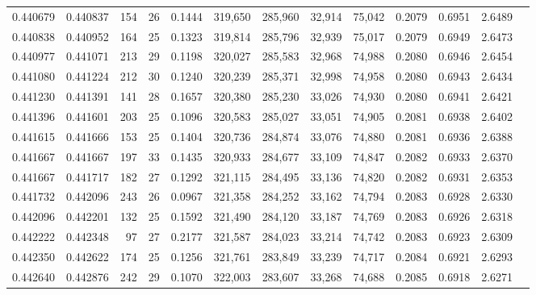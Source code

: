 \begin{tabular}{rrrrrrrrrrrrr}
0.440679 & 0.440837 &    154 &    26 &                                     0.1444 & 319,650 & 285,960 &  32,914 &  75,042 & 0.2079 & 0.6951 & 2.6489 \\
0.440838 & 0.440952 &    164 &    25 &                                     0.1323 & 319,814 & 285,796 &  32,939 &  75,017 & 0.2079 & 0.6949 & 2.6473 \\
0.440977 & 0.441071 &    213 &    29 &                                     0.1198 & 320,027 & 285,583 &  32,968 &  74,988 & 0.2080 & 0.6946 & 2.6454 \\
0.441080 & 0.441224 &    212 &    30 &                                     0.1240 & 320,239 & 285,371 &  32,998 &  74,958 & 0.2080 & 0.6943 & 2.6434 \\
0.441230 & 0.441391 &    141 &    28 &                                     0.1657 & 320,380 & 285,230 &  33,026 &  74,930 & 0.2080 & 0.6941 & 2.6421 \\
0.441396 & 0.441601 &    203 &    25 &                                     0.1096 & 320,583 & 285,027 &  33,051 &  74,905 & 0.2081 & 0.6938 & 2.6402 \\
0.441615 & 0.441666 &    153 &    25 &                                     0.1404 & 320,736 & 284,874 &  33,076 &  74,880 & 0.2081 & 0.6936 & 2.6388 \\
0.441667 & 0.441667 &    197 &    33 &                                     0.1435 & 320,933 & 284,677 &  33,109 &  74,847 & 0.2082 & 0.6933 & 2.6370 \\
0.441667 & 0.441717 &    182 &    27 &                                     0.1292 & 321,115 & 284,495 &  33,136 &  74,820 & 0.2082 & 0.6931 & 2.6353 \\
0.441732 & 0.442096 &    243 &    26 &                                     0.0967 & 321,358 & 284,252 &  33,162 &  74,794 & 0.2083 & 0.6928 & 2.6330 \\
0.442096 & 0.442201 &    132 &    25 &                                     0.1592 & 321,490 & 284,120 &  33,187 &  74,769 & 0.2083 & 0.6926 & 2.6318 \\
0.442222 & 0.442348 &     97 &    27 &                                     0.2177 & 321,587 & 284,023 &  33,214 &  74,742 & 0.2083 & 0.6923 & 2.6309 \\
0.442350 & 0.442622 &    174 &    25 &                                     0.1256 & 321,761 & 283,849 &  33,239 &  74,717 & 0.2084 & 0.6921 & 2.6293 \\
0.442640 & 0.442876 &    242 &    29 &                                     0.1070 & 322,003 & 283,607 &  33,268 &  74,688 & 0.2085 & 0.6918 & 2.6271 \\

\end{tabular}
